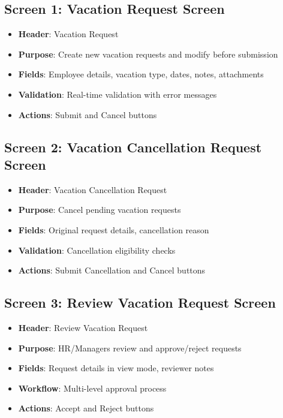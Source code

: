 \documentclass[12pt,a4paper]{article}
\begin{document}
\subsection{Screen 1: Vacation Request Screen}
\begin{itemize}
    \item \textbf{Header}: Vacation Request
    \item \textbf{Purpose}: Create new vacation requests and modify before submission
    \item \textbf{Fields}: Employee details, vacation type, dates, notes, attachments
    \item \textbf{Validation}: Real-time validation with error messages
    \item \textbf{Actions}: Submit and Cancel buttons
\end{itemize}

\subsection{Screen 2: Vacation Cancellation Request Screen}
\begin{itemize}
    \item \textbf{Header}: Vacation Cancellation Request
    \item \textbf{Purpose}: Cancel pending vacation requests
    \item \textbf{Fields}: Original request details, cancellation reason
    \item \textbf{Validation}: Cancellation eligibility checks
    \item \textbf{Actions}: Submit Cancellation and Cancel buttons
\end{itemize}

\subsection{Screen 3: Review Vacation Request Screen}
\begin{itemize}
    \item \textbf{Header}: Review Vacation Request
    \item \textbf{Purpose}: HR/Managers review and approve/reject requests
    \item \textbf{Fields}: Request details in view mode, reviewer notes
    \item \textbf{Workflow}: Multi-level approval process
    \item \textbf{Actions}: Accept and Reject buttons
\end{itemize}
\end{document}
